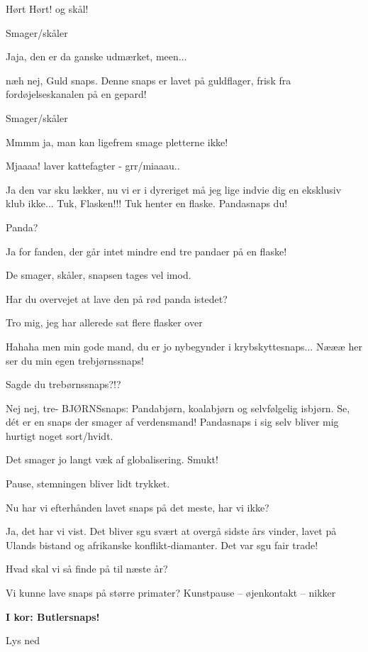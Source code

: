 \documentclass[a4paper,12pt]{article}
\begin{document}
\begin{sketch}
Hørt Hørt! og skål!

\scene Smager/skåler

Jaja, den er da ganske udmærket, meen...

næh nej, Guld snaps. Denne snaps er lavet på guldflager, frisk fra fordøjelseskanalen på en gepard! 

\scene Smager/skåler

Mmmm ja, man kan ligefrem smage pletterne ikke!

Mjaaaa! laver kattefagter - grr/miaaau.. 

Ja den var sku lækker, nu vi er i dyreriget må jeg lige indvie dig en eksklusiv klub ikke... Tuk, Flasken!!! Tuk henter en flaske. Pandasnaps du!

Panda?

Ja for fanden, der går intet mindre end tre pandaer på en flaske!

\scene De smager, skåler, snapsen tages vel imod. 

Har du overvejet at lave den på rød panda istedet?

Tro mig, jeg har allerede sat flere flasker over

Hahaha men min gode mand, du er jo nybegynder i krybskyttesnaps... Næææ her ser du min egen trebjørnssnaps! 

Sagde du trebørnssnaps?!? 

Nej nej, tre- BJØRNSsnaps: Pandabjørn, koalabjørn og selvfølgelig isbjørn. Se, dét er en snaps der smager af verdensmand! Pandasnaps i sig selv bliver mig hurtigt noget sort/hvidt. 

Det smager jo langt væk af globalisering. Smukt!

\scene Pause, stemningen bliver lidt trykket. 

Nu har vi efterhånden lavet snaps på det meste, har vi ikke?

Ja, det har vi vist. Det bliver sgu svært at overgå sidste års vinder, lavet på Ulands bistand og afrikanske konflikt-diamanter. Det var sgu fair trade!

Hvad skal vi så finde på til næste år?

Vi kunne lave snaps på større primater?  Kunstpause -- øjenkontakt -- nikker

\scene \textbf{I kor: Butlersnaps!}

\scene Lys ned


\end{sketch}
\end{document}
